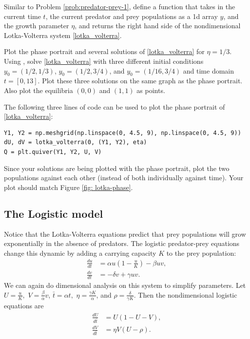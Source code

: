 \begin{problem}
Similar to Problem \ref{prob:predator-prey-1}, define a function  that takes in the current time $t$, the current predator and prey populations as a 1d array $y$, and the growth parameter $\eta$, and returns the right hand side of the nondimensional Lotka-Volterra system \eqref{lotka_volterra}.

Plot the phase portrait and several solutions of \eqref{lotka_volterra} for $\eta=1/3$.
Using , solve \eqref{lotka_volterra} with three different initial conditions $y_0 = (1/2, 1/3)$, $y_0=(1/2, 3/4)$, and $y_0=(1/16, 3/4)$ and time domain $t = [0,13]$. 
Plot these three solutions on the same graph as the phase portrait.
Also plot the equilibria $(0,0)$ and $(1,1)$ as points.

The following three lines of code can be used to plot the phase portrait of \eqref{lotka_volterra}:
\begin{lstlisting}
Y1, Y2 = np.meshgrid(np.linspace(0, 4.5, 9), np.linspace(0, 4.5, 9))
dU, dV = lotka_volterra(0, (Y1, Y2), eta)
Q = plt.quiver(Y1, Y2, U, V)
\end{lstlisting}

Since your solutions are being plotted with the phase portrait, plot the two populations against each other (instead of both individually against time). Your plot should match Figure \ref{fig: lotka-phase}.
\end{problem}


\subsection*{The Logistic model}
Notice that the Lotka-Volterra equations predict that prey populations will grow exponentially in the absence of predators. The logistic predator-prey equations change this dynamic by adding a carrying capacity $K$ to the prey population:
\begin{align*}
	\frac{du}{dt} &= \alpha u\left(1 -\frac{u}{K}\right) - \beta uv,\\
	\frac{dv}{dt} &= -\delta v + \gamma uv.
\end{align*}
We can again do dimensional analysis on this system to simplify parameters. Let $U = \frac{u}{K},$ $V = \frac{\beta}{\alpha}v$, $\bar{t} = \alpha t,$  $\eta = \frac{\gamma K}{\alpha}$, and $\rho = \frac{\delta}{\gamma K}$.
Then the nondimensional logistic equations are
\begin{align}
	\begin{split}
	\frac{dU}{d\bar{t}} &= U(1-U-V),\\
	\frac{dV}{d\bar{t}} &= \eta V (U-\rho).
	\end{split} \label{logistic_pred_prey}
\end{align}

